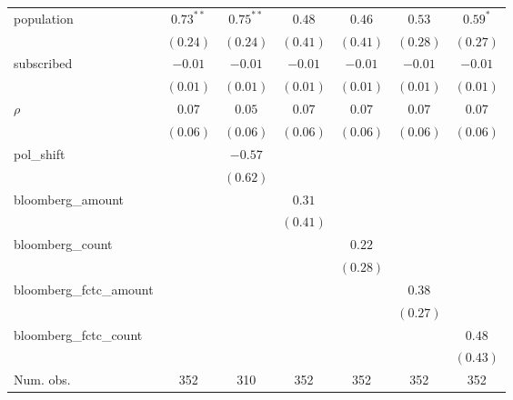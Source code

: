 \begin{table}[!h]
\begin{center}
\begin{tabular}{l c c c c c c }
population              & $0.73^{**}$  & $0.75^{**}$  & $0.48$       & $0.46$       & $0.53$       & $0.59^{*}$   \\
                        & $(0.24)$     & $(0.24)$     & $(0.41)$     & $(0.41)$     & $(0.28)$     & $(0.27)$     \\
subscribed              & $-0.01$      & $-0.01$      & $-0.01$      & $-0.01$      & $-0.01$      & $-0.01$      \\
                        & $(0.01)$     & $(0.01)$     & $(0.01)$     & $(0.01)$     & $(0.01)$     & $(0.01)$     \\
$\rho$                  & $0.07$       & $0.05$       & $0.07$       & $0.07$       & $0.07$       & $0.07$       \\
                        & $(0.06)$     & $(0.06)$     & $(0.06)$     & $(0.06)$     & $(0.06)$     & $(0.06)$     \\
pol\_shift              &              & $-0.57$      &              &              &              &              \\
                        &              & $(0.62)$     &              &              &              &              \\
bloomberg\_amount       &              &              & $0.31$       &              &              &              \\
                        &              &              & $(0.41)$     &              &              &              \\
bloomberg\_count        &              &              &              & $0.22$       &              &              \\
                        &              &              &              & $(0.28)$     &              &              \\
bloomberg\_fctc\_amount &              &              &              &              & $0.38$       &              \\
                        &              &              &              &              & $(0.27)$     &              \\
bloomberg\_fctc\_count  &              &              &              &              &              & $0.48$       \\
                        &              &              &              &              &              & $(0.43)$     \\
\midrule
Num. obs.               & 352          & 310          & 352          & 352          & 352          & 352          \\

\end{tabular}
\end{center}
\end{table}
